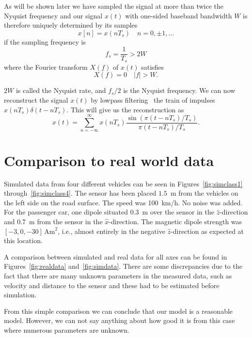 As will be shown later we have sampled the signal at more than twice the Nyquist frequency and our signal $x(t)$ with one-sided baseband bandwidth $W$ is therefore uniquely determined by its samples
\begin{equation}
 x[n] = x(nT_s)\quad  n=0,\pm1, \ldots
\end{equation}
if the sampling frequency is
\begin{equation}
 f_s = \frac{1}{T_s} > 2W
\end{equation}
where the Fourier transform $X(f)$ of $x(t)$ satisfies 
\begin{equation}
X(f)=0\quad |f|>W. 
\end{equation}

$2W$ is called the Nyquist rate, and $f_s/2$ is the Nyquist frequency. We can now reconstruct the signal $x(t)$ by lowpass filtering~\cite{ali} the train of impulses \mbox{$x(nT_s)\delta{}(t-nT_s)$.} This will give us the reconstruction as
\begin{equation}
 x(t) = \sum_{n=-\infty}^{\infty} x(nT_s) \frac{\sin{\left(\pi{}(t-nT_s)/T_s\right)}}{\pi{}(t-nT_s)/T_s}.
\end{equation}

\section{Comparison to real world data} %
Simulated data from four different vehicles can be seen in \mbox{Figures \ref{fig:simclass1}} \mbox{through \ref{fig:simclass4}}. The sensor has been placed \mbox{$1.5$ m} from the vehicles on the left side on the road surface. The speed was \mbox{100 km/h.} No noise was added. For the passenger car, one dipole situated 0.3~m over the sensor in the $\hat{z}$-direction and 0.7~m from the sensor in the $\hat{x}$-direction. The magnetic dipole strength was $[-3,0,-30]\,\text{Am}^2$, i.e., almost entirely in the negative $\hat{z}$-direction as expected at this location.

A comparison between simulated and real data for all axes can be found in Figures~\ref{fig:realdata} and~\ref{fig:simdata}. There are some discrepancies due to the fact that there are many unknown parameters in the measured data, such as velocity and distance to the sensor and these had to be estimated before simulation.

From this simple comparison we can conclude that our model is a reasonable model. However, we can not say anything about how good it is from this case where numerous parameters are unknown.

